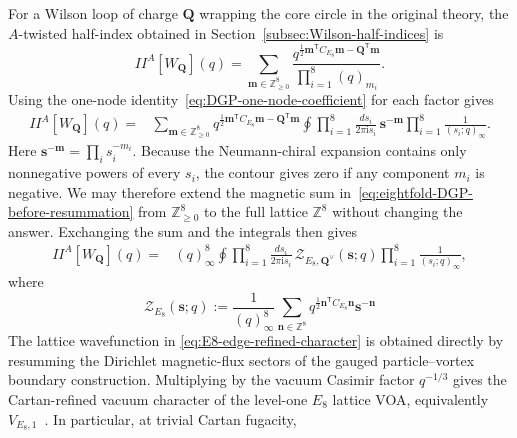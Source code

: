 \documentclass[11pt,a4paper]{article}
\numberwithin{equation}{section}
\begin{document}
For a Wilson loop of charge $\boldsymbol Q$ wrapping the core circle in the original theory, the $A$-twisted half-index obtained in Section~\ref{subsec:Wilson-half-indices} is
\begin{equation}
  I\!\!I^{A}[W_{\boldsymbol Q}](q)
  =
  \sum_{\boldsymbol m\in\mathbb Z_{\geq0}^8}
  \frac{
  q^{\frac12\boldsymbol m^{\mathsf T}C_{E_8}\boldsymbol m
  -\boldsymbol Q^{\mathsf T}\boldsymbol m}
  }{
  \prod_{i=1}^8(q)_{m_i}
  }.
  \label{eq:section35-original-Wilson-half-index}
\end{equation}
Using the one-node identity~\eqref{eq:DGP-one-node-coefficient} for each factor gives
\begin{equation}
\begin{aligned}
  I\!\!I^{A}[W_{\boldsymbol Q}](q)
  ={}&
  \sum_{\boldsymbol m\in\mathbb Z_{\geq0}^8}
  q^{\frac12\boldsymbol m^{\mathsf T}C_{E_8}\boldsymbol m
  -\boldsymbol Q^{\mathsf T}\boldsymbol m}
  \oint
  \prod_{i=1}^8\frac{ds_i}{2\pi \mathrm{i} s_i}\,
  \boldsymbol s^{-\boldsymbol m}
  \prod_{i=1}^8\frac1{(s_i;q)_\infty}.
  \label{eq:eightfold-DGP-before-resummation}
\end{aligned}
\end{equation}
Here $\boldsymbol s^{-\boldsymbol m}=\prod_i s_i^{-m_i}$.  Because the Neumann-chiral expansion contains only nonnegative powers of every $s_i$, the contour gives zero if any component $m_i$ is negative.  We may therefore extend the magnetic sum in~\eqref{eq:eightfold-DGP-before-resummation} from $\mathbb Z_{\geq0}^8$ to the full lattice $\mathbb Z^8$ without changing the answer.  Exchanging the sum and the integrals then gives
\begin{equation}
\begin{aligned}
  I\!\!I^{A}[W_{\boldsymbol Q}](q)
  ={}&
  (q)_\infty^8
  \oint
  \prod_{i=1}^8\frac{ds_i}{2\pi \mathrm{i} s_i}\,
  \mathcal Z_{E_8,\boldsymbol Q^\vee}(\boldsymbol s;q)
  \prod_{i=1}^8\frac1{(s_i;q)_\infty},
  \label{eq:eightfold-DGP-resummed-kernel}
\end{aligned}
\end{equation}
where
\begin{equation}
  \mathcal Z_{E_8}(\boldsymbol s;q)
  :=
  \frac1{(q)_\infty^8}
  \sum_{\boldsymbol n\in\mathbb Z^8}
  q^{\frac12\boldsymbol n^{\mathsf T}C_{E_8}\boldsymbol n}
  \boldsymbol s^{-\boldsymbol n}
  \label{eq:E8-edge-refined-character}
\end{equation}
The lattice wavefunction in \eqref{eq:E8-edge-refined-character} is obtained directly by resumming the Dirichlet magnetic-flux sectors of the gauged particle--vortex boundary construction.  Multiplying by the vacuum Casimir factor $q^{-1/3}$ gives the Cartan-refined vacuum character of the level-one $E_8$ lattice VOA, equivalently $V_{E_8,1}$~\cite{FrenkelKac:1980}.  In particular, at trivial Cartan fugacity,
\end{document}
